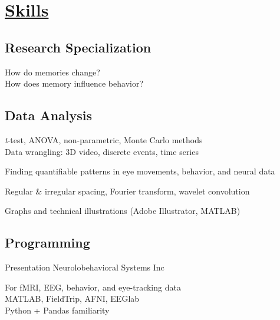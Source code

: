 \documentclass[]{winter-resume-openfont}
\begin{document}
\begin{minipage}[t]{0.3\textwidth} 


 
 \sectionsep
\section{\underline{Skills}}
\sectionsep
\subsection{Research Specialization}

\textbullet{} How do memories change?  \\ 
\textbullet{} How does memory influence behavior? \\  
\sectionsep

\sectionsep
\subsection{Data Analysis}
\textbullet{} \emph{t}-test, ANOVA, non-parametric, Monte Carlo methods \\
\textbullet{} Data wrangling: 3D video, discrete events, time series
\sectionsep
 

\textbullet{} Finding quantifiable patterns in eye movements, behavior, and neural data \\
\sectionsep
 
\textbullet{}  Regular \& irregular spacing, Fourier transform, wavelet convolution \\
\sectionsep
 

\textbullet{}  Graphs and technical illustrations (Adobe Illustrator, MATLAB) \\
 
 \sectionsep
\sectionsep
\subsection{Programming}
\textbullet{}  Presentation Neurolobehavioral Systems Inc \\
\sectionsep
 

\textbullet{}  For fMRI, EEG, behavior, and eye-tracking data \\
\textbullet{}  MATLAB, FieldTrip, AFNI, EEGlab \\
\textbullet{}  Python + Pandas familiarity \\
\sectionsep
\sectionsep

\end{minipage}
\end{document}
